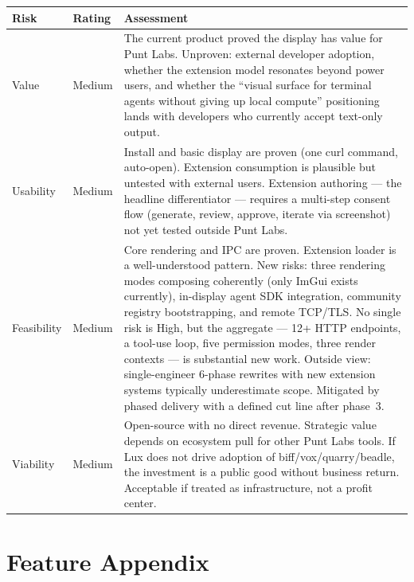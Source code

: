 \documentclass[11pt,letterpaper]{article}
\begin{document}
\renewcommand{\arraystretch}{1.6}
\begin{tabularx}{\textwidth}{@{} l l X @{}}
\toprule
\textbf{\color{SectionBlue}Risk} & \textbf{\color{SectionBlue}Rating} & \textbf{\color{SectionBlue}Assessment} \\
\midrule
Value      & \textcolor{RiskAmber}{Medium} &
  The current product proved the display has value for Punt Labs.
  Unproven: external developer adoption, whether the extension model
  resonates beyond power users, and whether the ``visual surface for
  terminal agents without giving up local compute'' positioning lands
  with developers who currently accept text-only output. \\
Usability  & \textcolor{RiskAmber}{Medium} &
  Install and basic display are proven (one curl command, auto-open).
  Extension consumption is plausible but untested with external users.
  Extension authoring --- the headline differentiator --- requires a
  multi-step consent flow (generate, review, approve, iterate via
  screenshot) not yet tested outside Punt Labs. \\
Feasibility & \textcolor{RiskAmber}{Medium} &
  Core rendering and IPC are proven.  Extension loader is a
  well-understood pattern.  New risks: three rendering modes composing
  coherently (only ImGui exists currently), in-display agent SDK
  integration, community registry bootstrapping, and remote TCP/TLS.
  No single risk is High, but the aggregate --- 12+ HTTP endpoints,
  a tool-use loop, five permission modes, three render contexts ---
  is substantial new work.  Outside view: single-engineer 6-phase
  rewrites with new extension systems typically underestimate scope.
  Mitigated by phased delivery with a defined cut line after phase~3. \\
Viability  & \textcolor{RiskAmber}{Medium} &
  Open-source with no direct revenue.  Strategic value depends on
  ecosystem pull for other Punt Labs tools.  If Lux does not drive
  adoption of biff/vox/quarry/beadle, the investment is a public good
  without business return.  Acceptable if treated as infrastructure,
  not a profit center. \\
\bottomrule
\end{tabularx}
\renewcommand{\arraystretch}{1.0}


\newpage
\section*{Feature Appendix}
\end{document}
